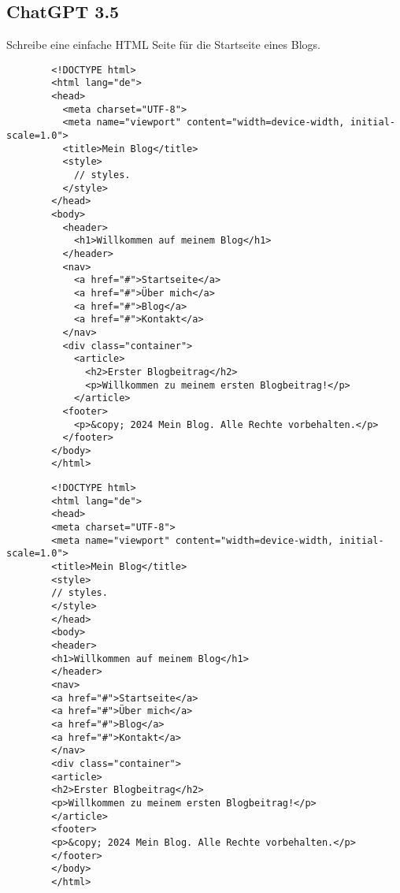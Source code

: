 \subsection{ChatGPT 3.5}
\begin{tcolorbox}[
	enhanced,
	colback=BhtColorYellow!5!white,
	colframe=BhtColorYellow!75!black,
	title= HTML Startseite
	]
	Schreibe eine einfache HTML Seite für die Startseite eines Blogs.
\end{tcolorbox}

\begin{tcolorbox}[
	enhanced,
	colback=BhtGrey!5!white,
	colframe=BhtGrey!75!black!50,
	title= ChatGPT 3.5
	]
	\begin{verbatim}
		<!DOCTYPE html>
		<html lang="de">
		<head>
		  <meta charset="UTF-8">
		  <meta name="viewport" content="width=device-width, initial-scale=1.0">
		  <title>Mein Blog</title>
		  <style>
		    // styles.
		  </style>
		</head>
		<body>
		  <header>
		    <h1>Willkommen auf meinem Blog</h1>
		  </header>
		  <nav>
		    <a href="#">Startseite</a>
		    <a href="#">Über mich</a>
		    <a href="#">Blog</a>
		    <a href="#">Kontakt</a>
		  </nav>
		  <div class="container">
		    <article>
		      <h2>Erster Blogbeitrag</h2>
		      <p>Willkommen zu meinem ersten Blogbeitrag!</p>
		    </article>
		  <footer>
		    <p>&copy; 2024 Mein Blog. Alle Rechte vorbehalten.</p>
		  </footer>
		</body>
		</html>
	\end{verbatim}
\end{tcolorbox}

\begin{tcolorbox}[
	enhanced,
	colback=BhtGrey!5!white,
	colframe=BhtGrey!75!black!50,
	title= ChatGPT 3.5
	]
	\begin{verbatim}
		<!DOCTYPE html>
		<html lang="de">
		<head>
		<meta charset="UTF-8">
		<meta name="viewport" content="width=device-width, initial-scale=1.0">
		<title>Mein Blog</title>
		<style>
		// styles.
		</style>
		</head>
		<body>
		<header>
		<h1>Willkommen auf meinem Blog</h1>
		</header>
		<nav>
		<a href="#">Startseite</a>
		<a href="#">Über mich</a>
		<a href="#">Blog</a>
		<a href="#">Kontakt</a>
		</nav>
		<div class="container">
		<article>
		<h2>Erster Blogbeitrag</h2>
		<p>Willkommen zu meinem ersten Blogbeitrag!</p>
		</article>
		<footer>
		<p>&copy; 2024 Mein Blog. Alle Rechte vorbehalten.</p>
		</footer>
		</body>
		</html>
	\end{verbatim}
\end{tcolorbox}

